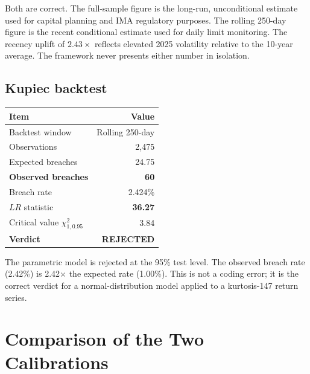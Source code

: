 \documentclass[11pt,a4paper]{article}
\begin{document}
\noindent Both are correct. The full-sample figure is the long-run,
unconditional estimate used for capital planning and IMA regulatory
purposes. The rolling 250-day figure is the recent conditional estimate
used for daily limit monitoring. The recency uplift of \(2.43\times\)
reflects elevated 2025 volatility relative to the 10-year average. The
framework never presents either number in isolation.

\subsection{Kupiec backtest}

\begin{table}[h!]
\centering
\renewcommand{\arraystretch}{1.3}
\begin{tabular}{L{7cm} r}
\toprule
\textbf{Item} & \textbf{Value} \\
\midrule
Backtest window                & Rolling 250-day \\
Observations                   & 2{,}475 \\
Expected breaches              & 24.75 \\
\textbf{Observed breaches}     & \textbf{60} \\
Breach rate                    & 2.424\% \\
\(LR\) statistic               & \textbf{36.27} \\
Critical value \(\chi^2_{1,0.95}\) & 3.84 \\
\textbf{Verdict}               & \textbf{REJECTED} \\
\bottomrule
\end{tabular}
\end{table}

\noindent The parametric model is rejected at the 95\% test level.
The observed breach rate (2.42\%) is 2.42\(\times\) the expected rate
(1.00\%). This is not a coding error; it is the correct verdict for a
normal-distribution model applied to a kurtosis-147 return series.

\section{Comparison of the Two Calibrations}
\end{document}
